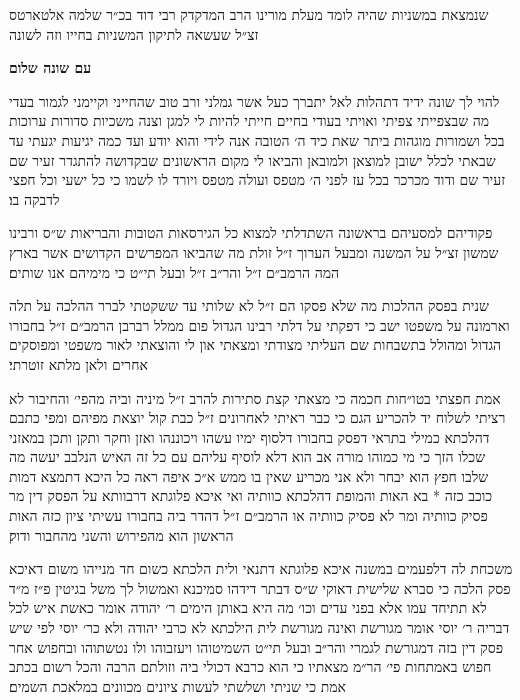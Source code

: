 \setcounter{page}{1}

{
  \centering
  \large
  שנמצאת במשניות שהיה לומד מעלת מורינו הרב המדקדק רבי דוד בכ״ר שלמה אלטארטס זצ״ל שעשאה לתיקון המשניות בחייו וזה לשונה
}

{\centering\LARGE\bfseries עם שונה שלום

}

{
  \small
  \centerlastline
  להוי לך שונה ידיד דתהלות לאל יתברך כעל אשר גמלני ורב טוב שהחייני
  וקיימני לגמור בעדי מה שבצפייתי צפיתי ואויתי בעודי בחיים חייתי להיות
  לי למגן וצנה משכיות סדורות ערוכות בכל ושמורות מוגהות ביתר שאת כיד ה׳
  הטובה אנה לידי\hdot
  והוא יודע ועד כמה יגיעות יגעתי עד שבאתי לכלל ישובן
למוצאן ולמובאן והביאו לי מקום הראשונים שבקדושה להתגדר זעיר שם זעיר שם
ו{\larger דוד}
    מכרכר בכל עז לפני ה׳ מטפס ועולה מטפס ויורד לו לשמו כי כל ישעי וכל
חפצי לדבקה בו׃

פקודיהם למסעיהם בראשונה השתדלתי למצוא כל הגירסאות הטובות
והבריאות ש״ס ורבינו שמשון זצ״ל על המשנה ומבעל הערוך ז״ל זולת מה
שהביאו המפרשים הקדושים אשר בארץ המה הרמב״ם ז״ל והר״ב ז״ל ובעל תי״ט
כי מימיהם אנו שותים׃

שנית בפסק ההלכות מה שלא פסקו הם ז״ל לא שלותי עד ששקטתי לברר
ההלכה על תלה וארמונה על משפטו ישב\hdot
כי דפקתי על דלתי רבינו הגדול
פום ממלל רברבן הרמב״ם ז״ל בחבורו הגדול ומהולל בתשבחות שם העליתי מצודתי
ומצאתי און לי והוצאתי לאור משפטי\hdot
ומפוסקים אחרים\hdot
ולאן מלתא זוטרתי׃

אמת חפצתי בטו״חות חכמה כי מצאתי קצת סתירות להרב ז״ל מיניה וביה
מהפי׳ והחיבור לא רציתי לשלוח יד להכריע\hdot
הגם כי כבר ראיתי לאחרונים
ז״ל כבת קול יוצאת מפיהם ומפי כתבם דהלכתא כמילי בתראי דפסק בחבורו
דלסוף ימיו עשהו ויכוננהו ואזן וחקר ותקן ותכן במאזני שכלו הזך כי מי כמוהו
מורה אב הוא דלא לוסיף עליהם עם כל זה האיש הנלבב יעשה מה שלבו חפץ הוא
יבחר ולא אני מכריע שאין בו ממש\hdot
א״כ איפה ראה כל היכא דתמצא דמות כוכב
כזה * בא האות והמופת דהלכתא כוותיה\hdot
ואי איכא פלוגתא דרבוותא על הפסק
דין מר פסיק כוותיה ומר לא פסיק כוותיה או הרמב״ם ז״ל דהדר ביה בחבורו
עשיתי ציון כזה
{\raisebox{-.5\height}{ ^^^^05af ^^^^0592}}
האות הראשון הוא מהפירוש והשני מהחבור ודוק׃

משכחת לה דלפעמים במשנה איכא פלוגתא דתנאי ולית הלכתא כשום חד
מנייהו משום דאיכא פסק הלכה כי סברא שלישית דאוקי ש״ס דבתר דידהו
סמיכנא\hdot
ואמשול לך משל בגיטין פ״ז מ״ד לא תתיחד עמו אלא בפני עדים וכו׳
מה היא באותן הימים ר׳ יהודה אומר כאשת איש לכל דבריה ר׳ יוסי אומר מגורשת
ואינה מגורשת\hdot
לית הילכתא לא כרבי יהודה ולא כר׳ יוסי לפי שיש פסק דין בזה
דמגורשת לגמרי והר״ב ובעל תי״ט השמיטוהו ויעזבוהו ולו נטשתוהו\hdot
ובחפוש אחר
חפוש באמתחות פי׳ הר״מ מצאתיו כי הוא כרבא דכולי ביה\hdot
וזולתם הרבה\hdot
והכל
רשום בכתב אמת כי שניתי ושלשתי לעשות ציונים מכוונים במלאכת השמים׃

}
